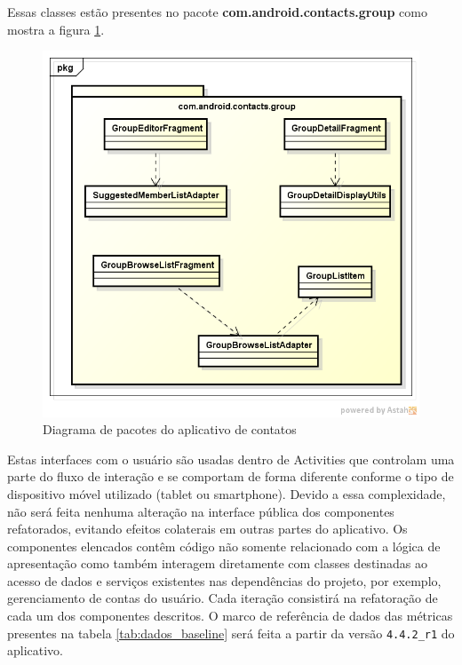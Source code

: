 Essas classes estão presentes no pacote \textbf{com.android.contacts.group} como
mostra a figura \ref{fig:classes_group_baseline}.

\begin{figure}[!h]
	\centering
	\includegraphics[scale=0.53]{img/classes_group_baseline.png}
	\caption{Diagrama de pacotes do aplicativo de contatos} 
	\label{fig:classes_group_baseline}
\end{figure}

Estas interfaces com o usuário são usadas dentro de Activities que controlam uma
parte do fluxo de interação e se comportam de forma diferente conforme o tipo de dispositivo
móvel utilizado (tablet ou smartphone). Devido a essa complexidade, não será
feita nenhuma alteração na interface pública dos componentes refatorados, evitando efeitos colaterais em
outras partes do aplicativo. Os componentes elencados contêm código não somente
relacionado com a lógica de apresentação como também interagem diretamente com classes destinadas ao acesso
de dados e serviços existentes nas dependências do projeto, por exemplo,
gerenciamento de contas do usuário.  Cada iteração consistirá na refatoração de
cada um dos componentes descritos. O marco de referência de dados das métricas presentes na tabela \ref{tab:dados_baseline} será feita a partir da
versão \verb|4.4.2_r1| do aplicativo.

